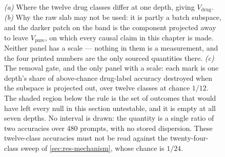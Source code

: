 \begin{figure}[htbp]
\begin{fullwidth}
\centering

\caption[The drug slab and its removal gate]{ \emph{(a)} Where the
twelve drug classes differ at one depth, giving $V_{\textrm{drug}}$.
\emph{(b)} Why the raw slab may not be used: it is partly a batch subspace, and
the darker patch on the band is the component projected away to leave
$V_{\textrm{pure}}$, on which every causal claim in this chapter is made.
Neither panel has a scale --- nothing in them is a measurement, and the four
printed numbers are the only sourced quantities there. \emph{(c)} The removal
gate, and the only panel with a scale: each mark is one depth's share of
above-chance drug-label accuracy destroyed when the subspace is projected out,
over twelve classes at chance $1/12$. The shaded region below the rule is the
set of outcomes that would have left every null in this section untestable, and
it is empty at all seven depths. No interval is drawn: the quantity is a single
ratio of two accuracies over \num{480} prompts, with no stored dispersion. These
twelve-class accuracies must not be read against the twenty-four-class sweep of
\cref{sec:res-mechanism}, whose chance is $1/24$.}
\label{fig:purify}
\end{fullwidth}
\end{figure}

